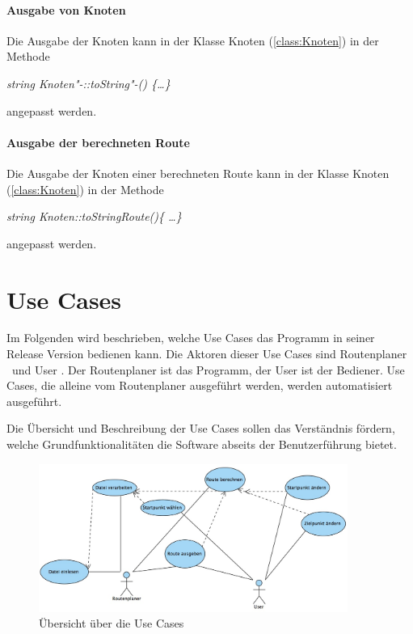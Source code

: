 \documentclass[12pt, a4paper, ngerman]{article}
\begin{document}
\paragraph{Ausgabe von Knoten}
Die Ausgabe der Knoten kann in der Klasse Knoten (\ref{class:Knoten}) in der Methode 

\textit{string Knoten"-::toString"-() \{\dots \}} 

angepasst werden.

\paragraph{Ausgabe der berechneten Route}
Die Ausgabe der Knoten einer berechneten Route kann in der Klasse Knoten (\ref{class:Knoten}) in der Methode 

\textit{string Knoten::toStringRoute()\{ \dots \}} 

angepasst werden.


\section{Use Cases}
Im Folgenden wird beschrieben, welche Use Cases das Programm in seiner Release Version bedienen kann. Die Aktoren dieser Use Cases sind \glqq Routenplaner \grqq~und \glqq User \grqq. Der Routenplaner ist das Programm, der User ist der Bediener. Use Cases, die alleine vom Routenplaner ausgeführt werden, werden automatisiert ausgeführt.

Die Übersicht und Beschreibung der Use Cases sollen das Verständnis fördern, welche Grundfunktionalitäten die Software abseits der Benutzerführung bietet.

\begin{figure}[htbp] 
  \centering
     \includegraphics[width=0.9\textwidth]{Grafiken/primaryUseCases.jpg}
  \caption{Übersicht über die Use Cases}
  \label{fig:uebersichtUseCases}
\end{figure}
\end{document}
